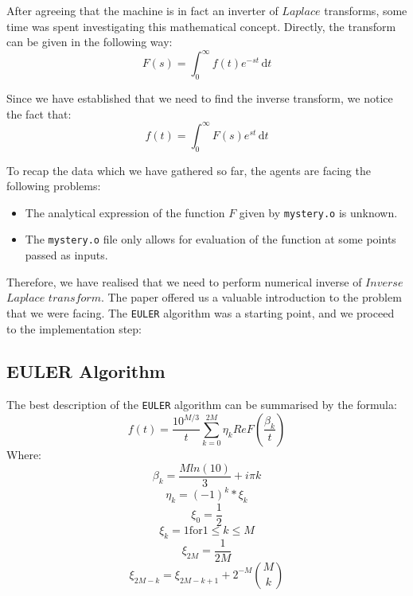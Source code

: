 After agreeing that the machine is in fact an inverter of $Laplace$ transforms, some time was spent investigating 
this mathematical concept. Directly, the transform can be given in the following way:
$$F(s) =\int_0^\infty \! f(t)e^{-st} \, \mathrm{d}t$$

Since we have established that we need to find the inverse transform, we notice the fact that:
$$f(t) =\int_0^\infty \! F(s)e^{st} \, \mathrm{d}t$$
\newline

To recap the data which we have gathered so far, the agents are facing the following problems:
\begin{itemize}
\item{The analytical expression of the function $F$ given by \texttt{mystery.o} is unknown. }
\item{The \texttt{mystery.o} file only allows for evaluation of the function at some points passed as inputs. }
\end{itemize}

Therefore, we have realised that we need to perform numerical inverse of $Inverse$ $Laplace$ $transform$.
The paper offered us a valuable introduction to the problem that we were facing.
The \texttt{EULER} algorithm was a starting point, and we proceed to the implementation step:

\subsection{EULER Algorithm}
The best description\cite{abate} of the \texttt{EULER} algorithm can be summarised by the formula:
$$f(t) = \frac{10^{M/3}}{t} \sum\limits_{k=0}^{2M} {\eta_k Re F(\frac{\beta_k}{t}) }$$
Where:
$$\beta_k = \frac{M ln(10)}{3} + i\pi k$$
$$\eta_k = (-1)^{k} *\xi_k$$
$$\xi_0 = \frac{1}{2}$$
$$\xi_k = 1 \text{for} 1 \leq k \leq M$$
$$\xi_{2M} = \frac{1}{2M}$$
$$\xi_{2M-k} = \xi_{2M-k+1}+2^{-M}\binom{M}{k}$$
\newline

